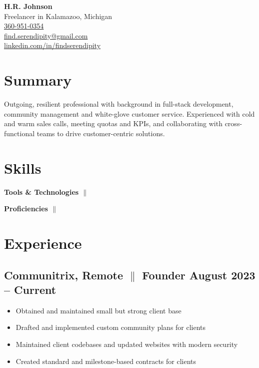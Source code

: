 \documentclass[a4paper,10pt]{article}
\begin{document}
\begin{center} %
      {\LARGE \textbf{H.R. Johnson}} \\
      Freelancer in Kalamazoo, Michigan \\
      \href{tel:360-951-0354}{360-951-0354}\\
      \href{mailto:find.serendipity@gmail.com}{find.serendipity@gmail.com}\\

      \mbox{\href{https://www.linkedin.com/in/findserendipity/}{linkedin.com/in/findserendipity}}
\end{center}

\section{Summary}
Outgoing, resilient professional with background in full-stack development, community management and white-glove customer service. Experienced with cold and warm sales calls, meeting quotas and KPIs, and collaborating
with cross-functional teams to drive customer-centric solutions. 

\section{Skills}
\textbf{Tools \& Technologies {$\parallel$} }

\textbf{Proficiencies {$\parallel$} }

\section{Experience}

\subsection{Communitrix, Remote {$\parallel$}{ Founder} \hfill
      \textbf{August 2023 – Current}}
\begin{itemize}
      \item Obtained and maintained small but strong client base
      \item Drafted and implemented custom community plans for clients
      \item Maintained client codebases and updated websites with modern security
      \item Created standard and milestone-based contracts for clients
\end{itemize}
\end{document}
